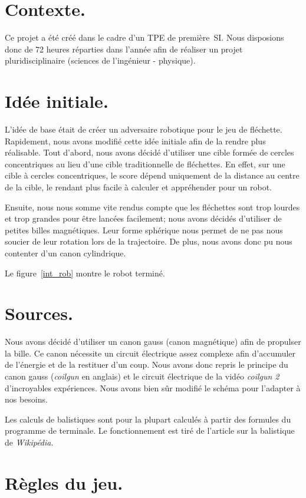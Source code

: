 \section{Contexte.}
Ce projet a été créé dans le cadre d'un TPE de première\ SI. Nous disposions donc de 72 heures réparties dans l'année afin de réaliser un projet pluridisciplinaire (sciences de l'ingénieur - physique).

\section{Idée initiale.}
L'idée de base était de créer un adversaire robotique pour le jeu de fléchette. Rapidement, nous avons modifié cette idée initiale afin de la rendre plus réalisable. Tout d'abord, nous avons décidé d'utiliser une cible formée de cercles concentriques au lieu d'une cible traditionnelle de fléchettes. En effet, sur une cible à cercles concentriques, le score dépend uniquement de la distance au centre de la cible, le rendant plus facile à calculer et appréhender pour un robot.

Ensuite, nous nous somme vite rendus compte que les fléchettes sont trop lourdes et trop grandes pour être lancées facilement; nous avons décidés d'utiliser de petites billes magnétiques. Leur forme sphérique nous permet de ne pas nous soucier de leur rotation lors de la trajectoire. De plus, nous avons donc pu nous contenter d'un canon cylindrique.

Le figure~\ref{int_rob} montre le robot terminé.

\section{Sources.}
Nous avons décidé d'utiliser un canon gauss (canon magnétique) afin de propulser la bille. Ce canon nécessite un circuit électrique assez complexe afin d'accumuler de l'énergie et de la restituer d'un coup. Nous avons donc repris le principe du canon gauss (\emph{coilgun} en anglais) et le circuit électrique de la vidéo \emph{coilgun 2} d'incroyables expériences. Nous avons bien sûr modifié le schéma pour l'adapter à nos besoins.

Les calculs de balistiques sont pour la plupart calculés à partir des formules du programme de terminale. Le fonctionnement est tiré de l'article sur la balistique de \emph{Wikipédia}.

\section{Règles du jeu.} \label{regles}
